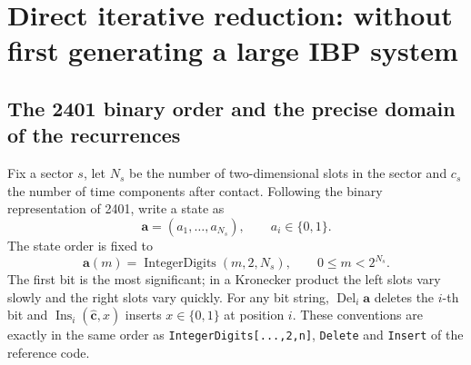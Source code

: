 \documentclass[11pt,a4paper]{article}
\begin{document}
\section{Direct iterative reduction: without first generating a large IBP system}

\subsection{The 2401 binary order and the precise domain of the recurrences}

Fix a sector $s$, let $N_s$ be the number of two-dimensional slots in the sector and $c_s$ the number of time components after contact. Following the binary representation of 2401, write a state as
\begin{equation}
 \bm a=(a_1,\ldots,a_{N_s}),
 \qquad a_i\in\{0,1\}.
\end{equation}
The state order is fixed to
\begin{equation}
 \bm a(m)=\operatorname{IntegerDigits}(m,2,N_s),
 \qquad 0\leq m<2^{N_s}.
 \label{eq:binary-state-order}
\end{equation}
The first bit is the most significant; in a Kronecker product the left slots vary slowly and the right slots vary quickly. For any bit string, $\operatorname{Del}_i\bm a$ deletes the $i$-th bit and $\operatorname{Ins}_i(\widehat{\bm c},x)$ inserts $x\in\{0,1\}$ at position $i$. These conventions are exactly in the same order as \texttt{IntegerDigits[...,2,n]}, \texttt{Delete} and \texttt{Insert} of the reference code.
\end{document}
